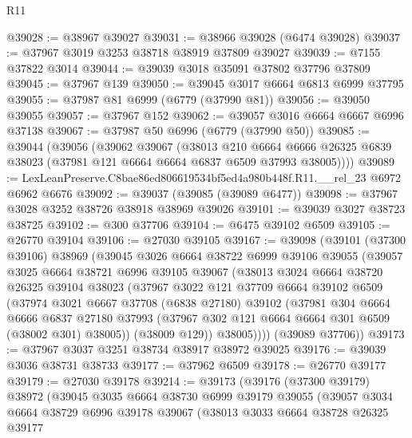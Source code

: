 \begin{lexlean}{R11}
\begin{coremodule}
@39028 := @38967 @39027
@39031 := @38966 @39028 (@6474 @39028)
@39037 := @37967 @3019 @3253 @38718 @38919 @37809 @39027
@39039 := @7155 @37822 @3014
@39044 := @39039 @3018 @35091 @37802 @37796 @37809
@39045 := @37967 @139
@39050 := @39045 @3017 @6664 @6813 @6999 @37795
@39055 := @37987 @81 @6999 (@6779 (@37990 @81))
@39056 := @39050 @39055
@39057 := @37967 @152
@39062 := @39057 @3016 @6664 @6667 @6996 @37138
@39067 := @37987 @50 @6996 (@6779 (@37990 @50))
@39085 := @39044
    (@39056
      (@39062
        @39067
        (@38013
          @210
          @6664
          @6666
          @26325
          @6839
          @38023
          (@37981 @121 @6664 @6664 @6837 @6509 @37993 @38005))))
@39089 := LexLeanPreserve.C8bae86ed806619534bf5ed4a980b448f.R11.__rel_23 @6972 @6962 @6676
@39092 := @39037 (@39085 (@39089 @6477))
@39098 := @37967 @3028 @3252 @38726 @38918 @38969 @39026
@39101 := @39039 @3027 @38723 @38725
@39102 := @300 @37706
@39104 := @6475 @39102 @6509
@39105 := @26770 @39104
@39106 := @27030 @39105
@39167 := @39098
    (@39101
      (@37300 @39106)
      @38969
      (@39045
        @3026
        @6664
        @38722
        @6999
        @39106
        @39055
        (@39057
          @3025
          @6664
          @38721
          @6996
          @39105
          @39067
          (@38013
            @3024
            @6664
            @38720
            @26325
            @39104
            @38023
            (@37967
              @3022
              @121
              @37709
              @6664
              @39102
              @6509
              (@37974
                @3021
                @6667
                @37708
                (@6838 @27180)
                @39102
                (@37981
                  @304
                  @6664
                  @6666
                  @6837
                  @27180
                  @37993
                  (@37967 @302 @121 @6664 @6664 @301 @6509 (@38002 @301) @38005))
                (@38009 @129))
              @38005))))
      (@39089 @37706))
@39173 := @37967 @3037 @3251 @38734 @38917 @38972 @39025
@39176 := @39039 @3036 @38731 @38733
@39177 := @37962 @6509
@39178 := @26770 @39177
@39179 := @27030 @39178
@39214 := @39173
    (@39176
      (@37300 @39179)
      @38972
      (@39045
        @3035
        @6664
        @38730
        @6999
        @39179
        @39055
        (@39057
          @3034
          @6664
          @38729
          @6996
          @39178
          @39067
          (@38013
            @3033
            @6664
            @38728
            @26325
            @39177

\end{coremodule}
\end{lexlean}
